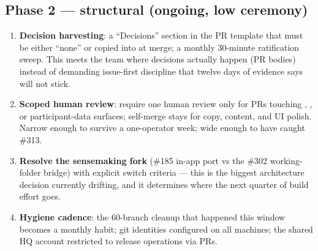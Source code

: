 \documentclass[10pt]{article}
\newcommand{\gh}[1]{\mbox{\##1}}
\begin{document}
\subsection{Phase 2 --- structural (ongoing, low ceremony)}
\begin{enumerate}
  \item \textbf{Decision harvesting}: a ``Decisions'' section in the PR template that must be either ``none'' or copied into  at merge; a monthly 30-minute ratification sweep. This meets the team where decisions actually happen (PR bodies) instead of demanding issue-first discipline that twelve days of evidence says will not stick.
  \item \textbf{Scoped human review}: require one human review only for PRs touching , , or participant-data surfaces; self-merge stays for copy, content, and UI polish. Narrow enough to survive a one-operator week; wide enough to have caught \gh{313}.
  \item \textbf{Resolve the sensemaking fork} (\gh{185} in-app port vs the \gh{302} working-folder bridge) with explicit switch criteria --- this is the biggest architecture decision currently drifting, and it determines where the next quarter of build effort goes.
  \item \textbf{Hygiene cadence}: the 60-branch cleanup that happened this window becomes a monthly habit; git identities configured on all machines; the shared HQ account restricted to release operations via PRs.
\end{enumerate}
\end{document}
